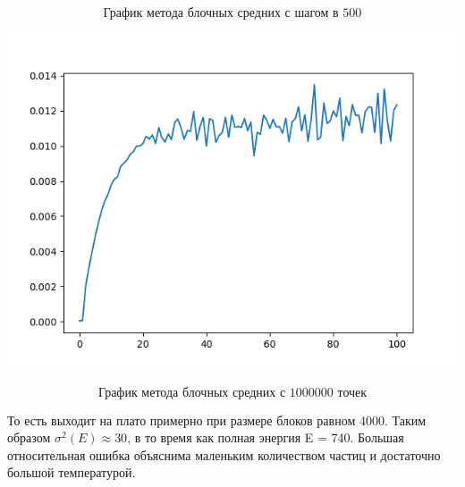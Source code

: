 \documentclass[a4paper, 12pt]{article}
\begin{document}
\[\textit{График метода блочных средних с шагом в 500}\]
\begin{center}
\includegraphics[scale=0.8]{fig}
\end{center}
\[\textit{График метода блочных средних с 1000000 точек}\]

То есть выходит на плато примерно при размере блоков равном 4000. Таким образом $\sigma^2(E) \approx 30$, в то время как полная энергия E = 740. Большая относительная ошибка объяснима маленьким количеством частиц и достаточно большой температурой.
\end{document}
